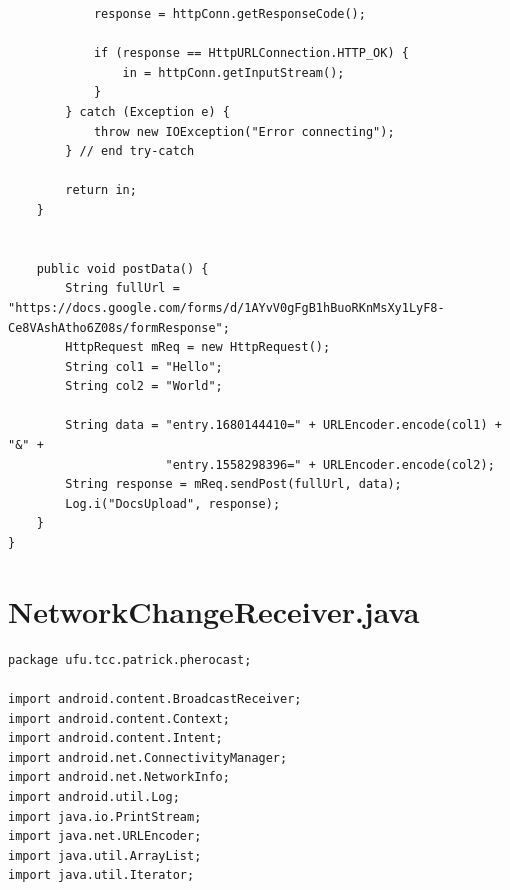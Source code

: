 \documentclass[12pt, %
openright, 
oneside, %
a4paper,    %
brazil]{facom-ufu-abntex2}
\begin{document}
\begin{anexosenv}
\begin{lstlisting}
            response = httpConn.getResponseCode();                 

            if (response == HttpURLConnection.HTTP_OK) {
                in = httpConn.getInputStream();                                 
            }                     
        } catch (Exception e) {
            throw new IOException("Error connecting");            
        } // end try-catch

        return in;     
    }
    

	public void postData() {
		String fullUrl = "https://docs.google.com/forms/d/1AYvV0gFgB1hBuoRKnMsXy1LyF8-Ce8VAshAtho6Z08s/formResponse";
		HttpRequest mReq = new HttpRequest();
		String col1 = "Hello";
		String col2 = "World";

		String data = "entry.1680144410=" + URLEncoder.encode(col1) + "&" + 
					  "entry.1558298396=" + URLEncoder.encode(col2);
		String response = mReq.sendPost(fullUrl, data);
		Log.i("DocsUpload", response);
	} 
}

\end{lstlisting}
\section{NetworkChangeReceiver.java}
\begin{lstlisting}
package ufu.tcc.patrick.pherocast;

import android.content.BroadcastReceiver;
import android.content.Context;
import android.content.Intent;
import android.net.ConnectivityManager;
import android.net.NetworkInfo;
import android.util.Log;
import java.io.PrintStream;
import java.net.URLEncoder;
import java.util.ArrayList;
import java.util.Iterator;


\end{lstlisting}
\end{anexosenv}
\end{document}
